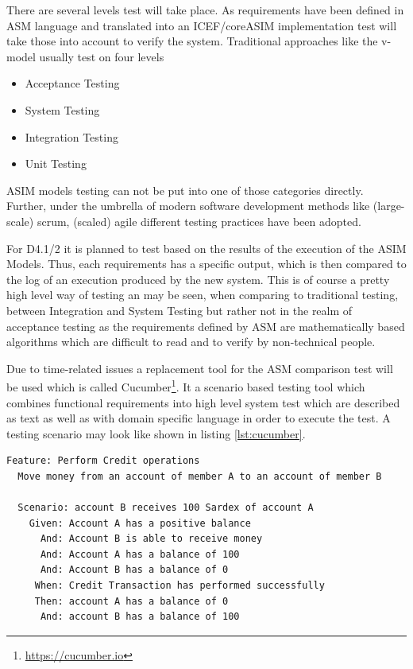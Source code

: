 There are several levels test will take place. As requirements have been defined in ASM language and translated into an ICEF/coreASIM implementation test will take those into account to verify the system. Traditional approaches like the v-model \cite{forsberg1991relationship} usually test on four levels

\begin{itemize}
	\item Acceptance Testing
	\item System Testing
	\item Integration Testing
	\item Unit Testing
\end{itemize}

ASIM models testing can not be put into one of those categories directly. Further, under the umbrella of modern software development methods like (large-scale) scrum, (scaled) agile different testing practices have been adopted.

For D4.1/2 it is planned to test based on the results of the execution of the ASIM Models. Thus, each requirements has a specific output, which is then compared to the log of an execution produced by the new system. This is of course a pretty high level way of testing an may be seen, when comparing to traditional testing, between Integration and System Testing but rather not in the realm of acceptance testing as the requirements defined by ASM are mathematically based algorithms which are difficult to read and to verify by non-technical people.

Due to time-related issues a replacement tool for the ASM comparison test will be used which is called Cucumber\footnote{\url{https://cucumber.io}}. It a scenario based testing tool which combines functional requirements into high level system test which are described as text as well as with domain specific language in order to execute the test. A testing scenario may look like shown in listing \ref{lst:cucumber}.

\begin{center}
\begin{minipage}{0.8\textwidth}
\small
\begin{lstlisting}[language=cucumber,firstnumber=1,caption={\bf\small Cucumber test example},captionpos=b,label=lst:cucumber]
Feature: Perform Credit operations
  Move money from an account of member A to an account of member B
  
  Scenario: account B receives 100 Sardex of account A
    Given: Account A has a positive balance
      And: Account B is able to receive money
      And: Account A has a balance of 100
      And: Account B has a balance of 0
     When: Credit Transaction has performed successfully
     Then: account A has a balance of 0
      And: account B has a balance of 100
\end{lstlisting}
\end{minipage}
\end{center}

